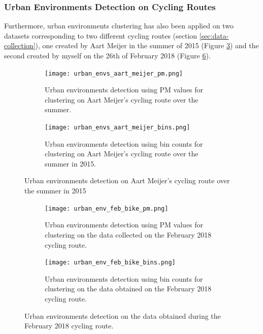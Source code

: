 \documentclass[bsc,frontabs,twoside,singlespacing, parskip,deptreport]{infthesis}     %
\begin{document}
\subsubsection*{Urban Environments Detection on Cycling Routes}

Furthermore, urban environments clustering has also been applied on two datasets corresponding to two different cycling routes (section \ref{sec:data-collection}), one created by Aart Meijer in the summer of 2015 (Figure \ref{fig:meijer-bike-urban-envs}) and the second created by myself on the 26th of February 2018 (Figure \ref{fig:feb-bike-urban-envs}).

\begin{figure}[h!]
  \begin{subfigure}[t]{0.5\textwidth}
    \texttt{[image: urban\_envs\_aart\_meijer\_pm.png]}
    \caption{Urban environments detection using PM values for clustering on Aart Meijer's cycling route over the summer.}
    \label{fig:meijer-bike-urban-envs-pm}
  \end{subfigure}
  \hfill
  \begin{subfigure}[t]{0.5\textwidth}
    \texttt{[image: urban\_envs\_aart\_meijer\_bins.png]}
    \caption{Urban environments detection using bin counts for clustering on Aart Meijer's cycling route over the summer in 2015.}
    \label{fig:meijer-bike-urban-envs-bins}
  \end{subfigure}
  \caption{Urban environments detection on Aart Meijer's cycling route over the summer in 2015}
  \label{fig:meijer-bike-urban-envs}
\end{figure}

\begin{figure}[h!]
  \begin{subfigure}[t]{\textwidth}
    \texttt{[image: urban\_env\_feb\_bike\_pm.png]}
    \caption{Urban environments detection using PM values for clustering on the data collected on the February 2018 cycling route.}
    \label{fig:feb-bike-urban-envs-pm}
  \end{subfigure}
  \hfill
  \begin{subfigure}[t]{\textwidth}
    \texttt{[image: urban\_env\_feb\_bike\_bins.png]}
    \caption{Urban environments detection using bin counts for clustering on the data obtained on the February 2018 cycling route.}
    \label{fig:feb-bike-urban-envs-bins}
  \end{subfigure}
  \caption{Urban environments detection on the data obtained during the February 2018 cycling route.}
  \label{fig:feb-bike-urban-envs}
\end{figure}
\end{document}
